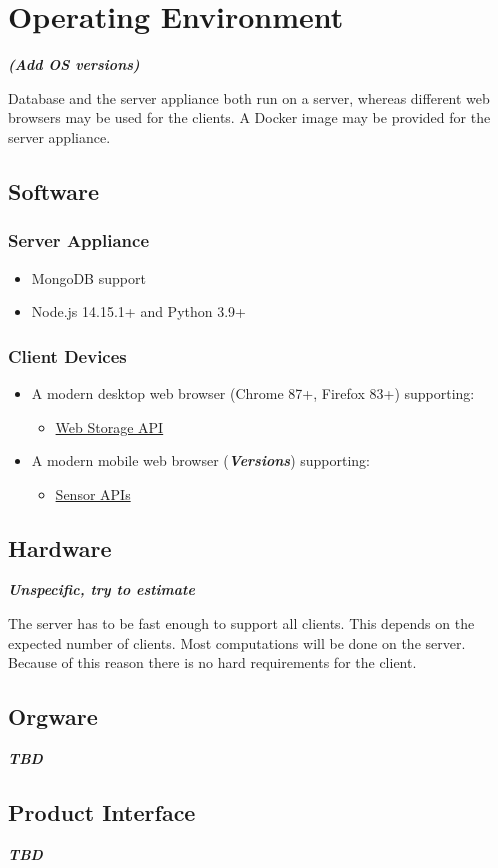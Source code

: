 \section{Operating Environment}
\textbf{\emph{(Add OS versions)}}

Database and the server appliance both run on a server, whereas different web browsers may be used for the clients. A Docker image may be provided for the server appliance.

\subsection{Software}
\subsubsection{Server Appliance}
\begin{itemize}
    \item MongoDB support
    \item Node.js 14.15.1+ and Python 3.9+
\end{itemize}
\subsubsection{Client Devices}
\begin{itemize}
    \item A modern desktop web browser (Chrome 87+, Firefox 83+) supporting:
    \begin{itemize}
        \item \href{https://developer.mozilla.org/en-US/docs/Web/API/Web_Storage_API}{Web Storage API}
    \end{itemize}
    \item A modern mobile web browser (\textbf{\emph{Versions}}) supporting:
    \begin{itemize}
        \item \href{https://developer.mozilla.org/en-US/docs/Web/API/Sensor_APIs}{Sensor APIs}
    \end{itemize}
\end{itemize}

\subsection{Hardware}
\textbf{\emph{Unspecific, try to estimate}}

The server has to be fast enough to support all clients. This depends on the expected number of clients. Most computations will be done on the server. Because of this reason there is no hard requirements for the client.

\subsection{Orgware}
\textbf{\emph{TBD}}

\subsection{Product Interface}
\textbf{\emph{TBD}}